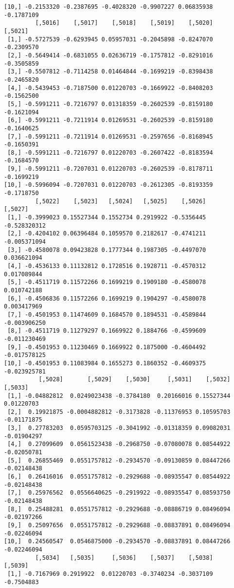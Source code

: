 \documentclass[
  letterpaper,
  DIV=11,
  numbers=noendperiod]{scrreprt}
\begin{document}
\begin{verbatim}
[10,] -0.2153320 -0.2387695 -0.4028320 -0.9907227 0.06835938 -0.1787109
         [,5016]    [,5017]    [,5018]    [,5019]    [,5020]    [,5021]
 [1,] -0.5727539 -0.6293945 0.05957031 -0.2045898 -0.8247070 -0.2309570
 [2,] -0.5649414 -0.6831055 0.02636719 -0.1757812 -0.8291016 -0.3505859
 [3,] -0.5507812 -0.7114258 0.01464844 -0.1699219 -0.8398438 -0.2465820
 [4,] -0.5439453 -0.7187500 0.01220703 -0.1669922 -0.8408203 -0.1562500
 [5,] -0.5991211 -0.7216797 0.01318359 -0.2602539 -0.8159180 -0.1621094
 [6,] -0.5991211 -0.7211914 0.01269531 -0.2602539 -0.8159180 -0.1640625
 [7,] -0.5991211 -0.7211914 0.01269531 -0.2597656 -0.8168945 -0.1650391
 [8,] -0.5991211 -0.7216797 0.01220703 -0.2607422 -0.8183594 -0.1684570
 [9,] -0.5991211 -0.7207031 0.01220703 -0.2602539 -0.8178711 -0.1699219
[10,] -0.5996094 -0.7207031 0.01220703 -0.2612305 -0.8193359 -0.1718750
         [,5022]    [,5023]   [,5024]   [,5025]    [,5026]      [,5027]
 [1,] -0.3999023 0.15527344 0.1552734 0.2919922 -0.5356445 -0.528320312
 [2,] -0.4204102 0.06396484 0.1059570 0.2182617 -0.4741211 -0.005371094
 [3,] -0.4580078 0.09423828 0.1777344 0.1987305 -0.4497070  0.036621094
 [4,] -0.4536133 0.11132812 0.1728516 0.1928711 -0.4570312  0.017089844
 [5,] -0.4511719 0.11572266 0.1699219 0.1909180 -0.4580078  0.010742188
 [6,] -0.4506836 0.11572266 0.1699219 0.1904297 -0.4580078  0.003417969
 [7,] -0.4501953 0.11474609 0.1684570 0.1894531 -0.4589844 -0.003906250
 [8,] -0.4511719 0.11279297 0.1669922 0.1884766 -0.4599609 -0.011230469
 [9,] -0.4501953 0.11230469 0.1669922 0.1875000 -0.4604492 -0.017578125
[10,] -0.4501953 0.11083984 0.1655273 0.1860352 -0.4609375 -0.023925781
          [,5028]       [,5029]    [,5030]     [,5031]    [,5032]     [,5033]
 [1,] -0.04882812  0.0249023438 -0.3784180  0.20166016 0.15527344  0.01220703
 [2,]  0.19921875 -0.0004882812 -0.3173828 -0.11376953 0.10595703 -0.01171875
 [3,]  0.27783203  0.0595703125 -0.3041992 -0.01318359 0.09082031 -0.01904297
 [4,]  0.27099609  0.0561523438 -0.2968750 -0.07080078 0.08544922 -0.02050781
 [5,]  0.26855469  0.0551757812 -0.2934570 -0.09130859 0.08447266 -0.02148438
 [6,]  0.26416016  0.0551757812 -0.2929688 -0.08935547 0.08544922 -0.02148438
 [7,]  0.25976562  0.0556640625 -0.2919922 -0.08935547 0.08593750 -0.02148438
 [8,]  0.25488281  0.0551757812 -0.2929688 -0.08886719 0.08496094 -0.02197266
 [9,]  0.25097656  0.0551757812 -0.2929688 -0.08837891 0.08496094 -0.02246094
[10,]  0.24560547  0.0546875000 -0.2934570 -0.08837891 0.08447266 -0.02246094
         [,5034]   [,5035]     [,5036]    [,5037]    [,5038]    [,5039]
 [1,] -0.7167969 0.2919922  0.01220703 -0.3740234 -0.3037109 -0.7504883

\end{verbatim}
\end{document}
